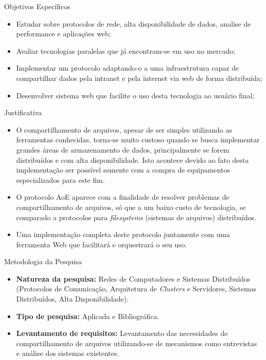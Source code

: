 \documentclass{beamer}
\begin{document}
\begin{frame}{Objetivos Específicos}
\begin{itemize}
\item Estudar sobre protocolos de rede, alta disponibilidade de dados, analise de performance e aplicações web;
\item Avaliar tecnologias paralelas que já encontram-se em uso no mercado;
\item Implementar um protocolo adaptando-o a uma infraestrutura capaz de compartilhar dados pela intranet e pela internet via web de forma distribuída;
\item Desenvolver sistema web que facilite o uso desta tecnologia ao usuário final;
\end{itemize}
\end{frame}


\begin{frame}{Justificativa}
\begin{itemize}
\item O compartilhamento de arquivos, apesar de ser simples utilizando as ferramentas conhecidas, torna-se muito custoso quando se busca implementar grandes áreas de armazenamento de dados, principalmente se forem distribuídos e com alta disponibilidade. Isto acontece devido ao fato desta implementação ser possível somente com a compra de equipamentos especializados para este fim.
\item O protocolo AoE aparece com a finalidade de resolver problemas de compartilhamento de arquivos, só que a um baixo custo de tecnologia, se comparado a protocolos para \textit{filesystems} (sistemas de arquivos) distribuídos.
\item Uma implementação completa deste protocolo juntamente com uma ferramenta Web que facilitará e orquestrará o seu uso.
\end{itemize}
\end{frame}


\begin{frame}{Metodologia da Pesquisa}
\begin{itemize}
\item \textbf{Natureza da pesquisa:} Redes de Computadores e Sistemas Distribuídos (Protocolos de Comunicação, Arquitetura de \textit{Clusters} e Servidores, Sistemas Distribuídos, Alta Disponibilidade).
\item \textbf{Tipo de pesquisa:} Aplicada e Bibliográfica.
\item \textbf{Levantamento de requisitos:} Levantamento das necessidades de compartilhamento de arquivos utilizando-se de mecanismos como entrevistas e análise dos sistemas existentes.
\end{itemize}
\end{frame}
\end{document}
